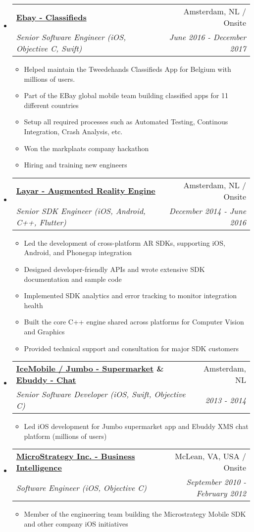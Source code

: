 \documentclass[letterpaper,11pt]{article}
\makeatletter
\newcommand{\resitem}[1]{\item #1 \vspace{-2pt}}
\newcommand{\ressubheading}[4]{
\begin{tabular*}{7.0in}{l@{\extracolsep{\fill}}r}
    \textbf{#1} & #2 \\
    \textit{#3} & \textit{#4} \\
\end{tabular*}\vspace{-6pt}}
\makeatother
\begin{document}
\begin{itemize}
\item
    \ressubheading{\href{https://www.markplaats.nl/}{Ebay - Classifieds}}{Amsterdam, NL / Onsite}{Senior Software Engineer (iOS, Objective C, Swift)}{June 2016 - December 2017}
    \begin{itemize}
        \resitem{Helped maintain the Tweedehands Classifieds App for Belgium with millions of users.}
        \resitem{Part of the EBay global mobile team building classified apps for 11 different countries}
        \resitem{Setup all required processes such as Automated Testing, Continous Integration, Crash Analysis, etc.}
        \resitem{Won the markplaats company hackathon}
        \resitem{Hiring and training new engineers}
    \end{itemize}
 
\item
    \ressubheading{\href{https://www.layar.com/}{Layar - Augmented Reality Engine}}{Amsterdam, NL / Onsite}{Senior SDK Engineer (iOS, Android, C++, Flutter)}{December 2014 - June 2016}
    \begin{itemize}
        \resitem{Led the development of cross-platform AR SDKs, supporting iOS, Android, and Phonegap integration}
        \resitem{Designed developer-friendly APIs and wrote extensive SDK documentation and sample code}
        \resitem{Implemented SDK analytics and error tracking to monitor integration health}
        \resitem{Built the core C++ engine shared across platforms for Computer Vision and Graphics}
        \resitem{Provided technical support and consultation for major SDK customers}
    \end{itemize}

\item
    \ressubheading{\href{https://www.icemobile.com}{IceMobile / Jumbo - Supermarket} \& \href{http://www.ebuddy.com}{Ebuddy - Chat}}{Amsterdam, NL}{Senior Software Developer (iOS, Swift, Objective C)}{2013 - 2014}
    \begin{itemize}
        \resitem{Led iOS development for Jumbo supermarket app and Ebuddy XMS chat platform (millions of users)}
    \end{itemize}

\item
    \ressubheading{\href{http://www.microstrategy.com/Company}{MicroStrategy Inc. - Business Intelligence}}{McLean, VA, USA / Onsite}{Software Engineer (iOS, Objective C)}{September 2010 - February 2012}
    \begin{itemize}
        \resitem{Member of the engineering team building the Microstrategy Mobile SDK and other company iOS initiatives}
    \end{itemize}
    

\end{itemize}
\end{document}
